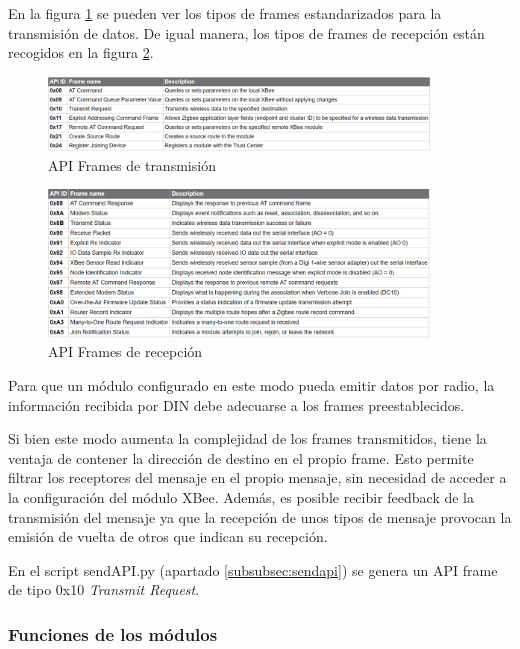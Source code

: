\begin{itemize}
En la figura \ref{fig:txAPI} se pueden ver los tipos de frames estandarizados para la transmisión de datos. De igual manera, los tipos de frames de recepción están recogidos en la figura \ref{fig:rxAPI}.

\begin{figure}[b]
\centering
\includegraphics[width=0.9\textwidth]{figuras/txAPIFrames.png}
\caption{API Frames de transmisión}
\label{fig:txAPI}
\end{figure}

\begin{figure}[H]
\centering
\includegraphics[width=0.9\textwidth]{figuras/rxAPIFrames.png}
\caption{API Frames de recepción}
\label{fig:rxAPI}
\end{figure}

Para que un módulo configurado en este modo pueda emitir datos por radio, la información recibida por DIN debe adecuarse a los frames preestablecidos.

Si bien este modo aumenta la complejidad de los frames transmitidos, tiene la ventaja de contener la dirección de destino en el propio frame. Esto permite filtrar los receptores del mensaje en el propio mensaje, sin necesidad de acceder a la configuración del módulo XBee. Además, es posible recibir feedback de la transmisión del mensaje ya que la recepción de unos tipos de mensaje provocan la emisión de vuelta de otros que indican su recepción.

En el script sendAPI.py (apartado \ref{subsubsec:sendapi}) se genera un API frame de tipo 0x10 \textit{Transmit Request}.

\end{itemize}

\subsubsection{Funciones de los módulos}

